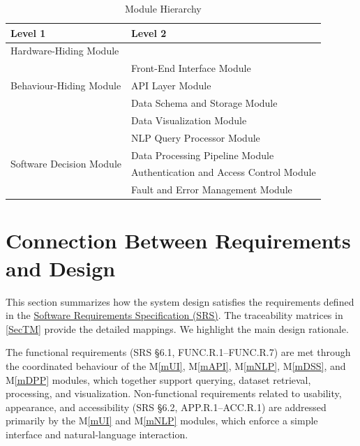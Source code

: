 \documentclass[12pt, titlepage]{article}
\newcommand{\mref}[1]{M\ref{#1}}
\begin{document}
\begin{table}[h!]
\centering
\begin{tabular}{p{} p{}}
\toprule
\textbf{Level 1} & \textbf{Level 2}\\
\midrule

{Hardware-Hiding Module} & ~ \\
\midrule

\multirow{3}{0.3\textwidth}{Behaviour-Hiding Module} & Front-End Interface Module\\
& API Layer Module\\
& Data Schema and Storage Module\\
& Data Visualization Module\\
\midrule

\multirow{4}{0.3\textwidth}{Software Decision Module} & NLP Query Processor Module\\
& Data Processing Pipeline Module\\
& Authentication and Access Control Module\\
& Fault and Error Management Module\\
\bottomrule

\end{tabular}
\caption{Module Hierarchy}
\label{TblMH}
\end{table}

\section{Connection Between Requirements and Design} \label{SecReqDesign}

This section summarizes how the system design satisfies the requirements defined in the \href{https://github.com/OCD-Rats-Capstone/OCD-Rat-Infrastructure/blob/main/docs/SRS-Volere/SRS.pdf}{Software Requirements Specification (SRS)}. The traceability matrices in \autoref{SecTM} provide the detailed mappings. We highlight the main design rationale.

The functional requirements (SRS §6.1, FUNC.R.1--FUNC.R.7) are met through the coordinated behaviour of the \mref{mUI}, \mref{mAPI}, \mref{mNLP}, \mref{mDSS}, and \mref{mDPP} modules, which together support querying, dataset retrieval, processing, and visualization. Non-functional requirements related to usability, appearance, and accessibility (SRS §6.2, APP.R.1--ACC.R.1) are addressed primarily by the \mref{mUI} and \mref{mNLP} modules, which enforce a simple interface and natural-language interaction.
\end{document}
